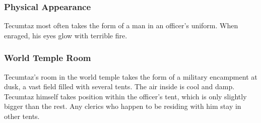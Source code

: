 \subsubsection*{Physical Appearance} 
Tecumtaz most often takes the form of a man in an officer's uniform.
When enraged, his eyes glow with terrible fire.

\subsubsection*{World Temple Room}
Tecumtaz's room in the world temple takes the form of a military encampment at dusk, a vast field filled with several tents.
The air inside is cool and damp.
Tecumtaz himself takes position within the officer's tent, which is only slightly bigger than the rest.
Any clerics who happen to be residing with him stay in other tents.